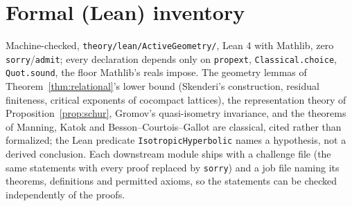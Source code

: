 \documentclass[11pt,reqno]{amsart}
\theoremstyle{plain}
\theoremstyle{definition}
\begin{document}
\section{Formal (Lean) inventory}
Machine-checked, \texttt{theory/lean/ActiveGeometry/}, Lean 4 with Mathlib, zero \texttt{sorry}/\texttt{admit}; every declaration depends only on \texttt{propext}, \texttt{Classical.choice}, \texttt{Quot.sound}, the floor Mathlib's reals impose. The geometry lemmas of Theorem~\ref{thm:relational}'s lower bound (Skenderi's construction, residual finiteness, critical exponents of cocompact lattices), the representation theory of Proposition~\ref{prop:schur}, Gromov's quasi-isometry invariance, and the theorems of Manning, Katok and Besson--Courtois--Gallot are classical, cited rather than formalized; the Lean predicate \texttt{IsotropicHyperbolic} names a hypothesis, not a derived conclusion. Each downstream module ships with a challenge file (the same statements with every proof replaced by \texttt{sorry}) and a job file naming its theorems, definitions and permitted axioms, so the statements can be checked independently of the proofs.
\end{document}
